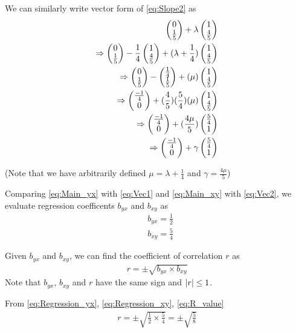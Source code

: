 \documentclass[journal,12pt,twocolumn]{IEEEtran}
\begin{document}
We can similarly write vector form of
\eqref{eq:Slope2}
as
\begin{align}
  \begin{pmatrix}0\\\frac{1}{5}\end{pmatrix} + \lambda\begin{pmatrix}1\\\frac{4}{5}\end{pmatrix}
  \\
  \Rightarrow \begin{pmatrix}0\\\frac{1}{5}\end{pmatrix} - \frac{1}{4}\begin{pmatrix}1\\\frac{4}{5}\end{pmatrix} + (\lambda + \frac{1}{4})\begin{pmatrix}1\\\frac{4}{5}\end{pmatrix}
  \\
  \Rightarrow \begin{pmatrix}0\\\frac{1}{5}\end{pmatrix} - \begin{pmatrix}\frac{1}{4}\\\frac{1}{5}\end{pmatrix} + (\mu)\begin{pmatrix}1\\\frac{4}{5}\end{pmatrix}
  \\
  \Rightarrow \begin{pmatrix}\frac{-1}{4}\\0\end{pmatrix} + (\frac{4}{5})(\frac{5}{4})(\mu)\begin{pmatrix}1\\\frac{4}{5}\end{pmatrix}
  \\
  \Rightarrow \begin{pmatrix}\frac{-1}{4}\\0\end{pmatrix} + (\frac{4\mu}{5})\begin{pmatrix}\frac{5}{4}\\1\end{pmatrix}
  \\
  \Rightarrow \begin{pmatrix}\frac{-1}{4}\\0\end{pmatrix} + \gamma\begin{pmatrix}\frac{5}{4}\\1\end{pmatrix}
  \label{eq:Vec2}  
\end{align}

(Note that we have arbitrarily defined $\mu = \lambda + \frac{1}{4}$ and $\gamma = \frac{4\mu}{5}$)

Comparing
\eqref{eq:Main_yx} with \eqref{eq:Vec1}
and
\eqref{eq:Main_xy} with \eqref{eq:Vec2},
we evaluate regression coefficents $b_{yx}$ and $b_{xy}$ as
\begin{align}
  &b_{yx} = \frac{1}{2}
  \label{eq:Regression_yx}
  \\
  &b_{xy} = \frac{5}{4}
  \label{eq:Regression_xy}
\end{align}

Given $b_{yx}$ and $b_{xy}$, we can find the coefficient of correlation $r$ as
\begin{align}
  r = \pm\sqrt{b_{yx} \times b_{xy}}
  \label{eq:R_value}
\end{align}
Note that $b_{yx}$, $b_{xy}$ and $r$ have the same sign and $\left\vert r\right\vert \le 1$.

From
\eqref{eq:Regression_yx},
\eqref{eq:Regression_xy},
\eqref{eq:R_value}
\begin{align}
  r = \pm \sqrt{\frac{1}{2} \times \frac{5}{4}} = \pm \sqrt{\frac{5}{8}}
\end{align}
\end{document}
